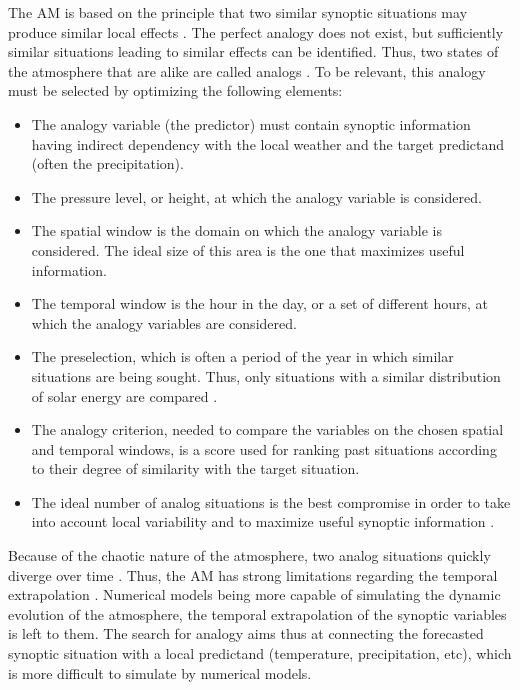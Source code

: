 \documentclass[review]{elsarticle}
\begin{document}
The AM is based on the principle that two similar synoptic situations may produce similar local effects \citep{Lorenz1956}. The perfect analogy does not exist, but sufficiently similar situations leading to similar effects can be identified. Thus, two states of the atmosphere that are alike are called analogs \citep{Lorenz1969}. To be relevant, this analogy must be selected by optimizing the following elements:

\begin{itemize}
	\item The analogy variable (the predictor) must contain synoptic information having indirect dependency with the local weather and the target predictand (often the precipitation).
	\item The pressure level, or height, at which the analogy variable is considered.
	\item The spatial window is the domain on which the analogy variable is considered. The ideal size of this area is the one that maximizes useful information.
	\item The temporal window is the hour in the day, or a set of different hours, at which the analogy variables are considered.
	\item The preselection, which is often a period of the year in which similar situations are being sought. Thus, only situations with a similar distribution of solar energy are compared \citep{Lorenz1969}.
	\item The analogy criterion, needed to compare the variables on the chosen spatial and temporal windows, is a score used for ranking past situations according to their degree of similarity with the target situation.
	\item The ideal number of analog situations is the best compromise in order to take into account local variability and to maximize useful synoptic information \citep{Bontron2004}.
\end{itemize}

Because of the chaotic nature of the atmosphere, two analog situations quickly diverge over time \citep{Lorenz1969}. Thus, the AM has strong limitations regarding the temporal extrapolation \citep{Bontron2004}. Numerical models being more capable of simulating the dynamic evolution of the atmosphere, the temporal extrapolation of the synoptic variables is left to them. The search for analogy aims thus at connecting the forecasted synoptic situation with a local predictand (temperature, precipitation, etc), which is more difficult to simulate by numerical models.
\end{document}
